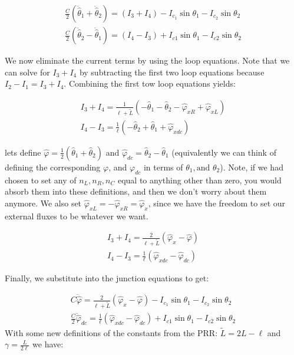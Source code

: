 \documentclass[paper=a4, twocolumn, fontsize=10pt]{article} %
\numberwithin{equation}{section} %
\numberwithin{figure}{section} %
\numberwithin{table}{section} %
\def \df#1{\hat{#1}}
\begin{document}
\begin{align}
\frac{C}{2} (\ddot{\df\theta}_1 + \ddot{\df\theta}_2 ) = (I_3 + I_4) - I_{c_1} \sin \theta_1 - I_{c_2} \sin \theta_2
\\
\frac{C}{2} (\ddot{\df\theta}_2 - \ddot{\df\theta}_1 ) = (I_4 - I_3) +I_{c1} \sin\theta_1 - I_{c2} \sin \theta_2
\end{align}

We now eliminate the current terms by using the loop equations. Note that we can solve for $I_3+I_4$ by subtracting the first two loop equations because $I_2 - I_1 = I_3+I_4$. Combining the first tow loop equations yields:

\begin{align}
    I_3 + I_4 = \frac{1}{\ell+\tilde{L}}\left(- \df\theta_1 - \df\theta_2 - \df\varphi_{xR} + \df\varphi_{xL} \right)
    \\
    I_4 - I_3 =\frac{1}{\ell}\left( -\df\theta_2 + \df\theta_1 +\df\varphi_{xdc}\right)
    \end{align}


lets define $\df\varphi = \frac{1}{2}\left(\df\theta_1 + \df\theta_2\right)$ and $\df\varphi_{dc} = \df\theta_2 - \df\theta_1$ (equivalently we can think of defining the corresponding $\varphi$, and $\varphi_{dc}$ in terms of $\theta_1,\text{and } \theta_2$). Note, if we had chosen to set any of $n_L,n_R,n_C$ equal to anything other than zero, you would absorb them into these definitions, and then we don't worry about them anymore. We also set $\df\varphi_{xL} = -\df\varphi_{xR} = \df\varphi_x$, since we have the freedom to set our external fluxes to be whatever we want.

\begin{align}
    I_3 + I_4 = \frac{2}{\ell+\tilde{L}}\left(\df\varphi_x - \df\varphi \right)
    \\
    I_4 - I_3 =\frac{1}{\ell}\left(\df\varphi_{xdc} - \df\varphi_{dc} \right)
    \end{align}

Finally, we substitute into the junction equations to get:


\begin{align}
    C \ddot{\df\varphi} = \frac{2}{\ell+\tilde{L}}\left( \df\varphi_x - \df\varphi \right) - I_{c_1} \sin \theta_1 - I_{c_2} \sin \theta_2
    \\
    \frac{C}{2} \ddot{\df\varphi}_{dc}= \frac{1}{\ell}\left( \df\varphi_{xdc} -\df\varphi_{dc}\right) +I_{c1} \sin\theta_1 - I_{c2} \sin \theta_2
    \end{align}
With some new definitions of the constants from the PRR: $\tilde{L} = 2L-\ell$ and $\gamma = \frac{L}{2\ell}$ we have:
\end{document}
